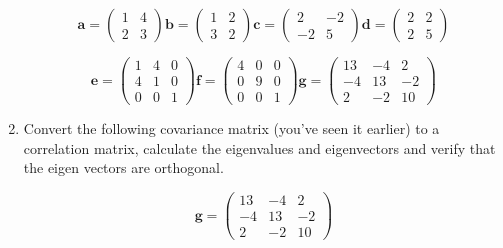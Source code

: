 \documentclass{article}
\begin{document}
\begin{enumerate}
\begin{displaymath}
\boldsymbol{a} = \left( \begin{array}{rr} 1 & 4\\ 2 & 3 \end{array} \right)
\boldsymbol{b} = \left( \begin{array}{rr} 1 & 2 \\ 3 & 2  \end{array} \right)
\boldsymbol{c} = \left( \begin{array}{rr} 2 & -2 \\ -2 & 5 \end{array} \right)
\boldsymbol{d} = \left( \begin{array}{rr} 2 & 2 \\ 2 & 5 \end{array} \right)
\end{displaymath}

\begin{displaymath}
\boldsymbol{e} = \left( \begin{array}{rrr} 1 & 4 & 0\\ 4 & 1 & 0 \\ 0 & 0 & 1 \end{array} \right)
\boldsymbol{f} = \left( \begin{array}{rrr} 4 & 0 & 0 \\ 0  & 9 & 0 \\ 0 & 0 & 1  \end{array} \right)
\boldsymbol{g} = \left( \begin{array}{rrr} 13 & -4 & 2\\ -4 & 13 & -2 \\ 2 & -2 & 10 \end{array} \right)
\end{displaymath}



\item Convert the following covariance matrix (you've seen it earlier) to a correlation matrix, calculate the eigenvalues and eigenvectors and verify that the eigen vectors are orthogonal.

\begin{displaymath}
\boldsymbol{g} = \left( \begin{array}{rrr} 13 & -4 & 2\\ -4 & 13 & -2 \\ 2 & -2 & 10 \end{array} \right)
\end{displaymath}


\end{enumerate}
\end{document}
